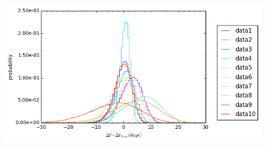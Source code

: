 \documentclass[\docopts]{\docclass}
\begin{document}
\begin{figure}[!h]
\includegraphics[width=\textwidth, height=15cm, keepaspectratio]{summary_prior_summary.png}
\caption{}
\label{fig:summary_prior}
\end{figure}
\end{document}
